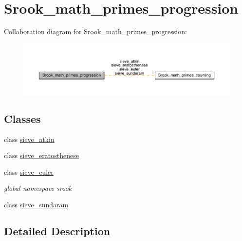 \hypertarget{group__srook__math__primes__progression}{}\section{Srook\+\_\+math\+\_\+primes\+\_\+progression}
\label{group__srook__math__primes__progression}
Collaboration diagram for Srook\+\_\+math\+\_\+primes\+\_\+progression\+:\nopagebreak
\begin{figure}[H]
\begin{center}
\leavevmode
\includegraphics[width=350pt]{group__srook__math__primes__progression}
\end{center}
\end{figure}
\subsection*{Classes}
\begin{DoxyCompactItemize}
\item 
class \mbox{\hyperlink{classsieve__atkin}{sieve\+\_\+atkin}}
\item 
class \mbox{\hyperlink{classsieve__eratosthenese}{sieve\+\_\+eratosthenese}}
\item 
class \mbox{\hyperlink{classsieve__euler}{sieve\+\_\+euler}}
\begin{DoxyCompactList}\small\item\em global namespace srook \end{DoxyCompactList}\item 
class \mbox{\hyperlink{classsieve__sundaram}{sieve\+\_\+sundaram}}
\end{DoxyCompactItemize}


\subsection{Detailed Description}
